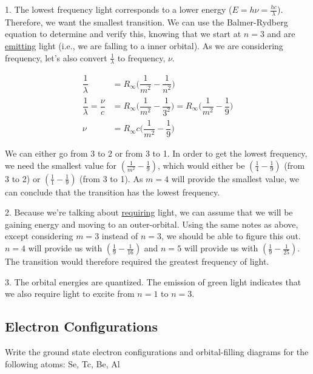\documentclass[12pt,letterpaper]{article}
\begin{document}
{\color{blue}

1. The lowest frequency light corresponds to a lower energy
($E=h\nu=\frac{hc}{\lambda}$). Therefore, we want the smallest transition. We
can use the Balmer-Rydberg equation to determine and verify this, knowing that
we start at $n=3$ and are \underline{emitting} light (i.e., we are falling to
a inner orbital). As we are considering frequency, let's also convert
$\frac{1}{\lambda}$ to frequency, $\nu$.

\begin{align*}
	\dfrac{1}{\lambda} &= R_\infty \bigg( \dfrac{1}{m^2} - \dfrac{1}{n^2}
	\bigg) \\
	\dfrac{1}{\lambda} = \dfrac{\nu}{c}
	&= R_\infty \bigg( \dfrac{1}{m^2} - \dfrac{1}{3^2} \bigg) 
	= R_\infty \bigg( \dfrac{1}{m^2} - \dfrac{1}{9} \bigg) \\
	\nu &= R_\infty c \bigg( \dfrac{1}{m^2} - \dfrac{1}{9} \bigg) 
\end{align*}

We can either go from 3 to 2 or from 3 to 1. In order to get the lowest
frequency, we need the smallest value for $(\frac{1}{m^2}-\frac{1}{9})$, which
would either be $(\frac{1}{4}-\frac{1}{9})$ (from 3 to 2) or
$(\frac{1}{1}-\frac{1}{9})$ (from 3 to 1). As $m=4$ will provide the smallest
value, we can conclude that the transition  has the lowest frequency.

2. Because we're talking about \underline{requiring} light, we can assume that
we will be gaining energy and moving to an outer-orbital. Using the same notes
as above, except considering $m=3$ instead of $n=3$, we should be able to figure
this out. $n=4$ will provide us with $(\frac{1}{9}-\frac{1}{16})$ and $n=5$ will
provide us with $(\frac{1}{9}-\frac{1}{25})$. The transition
 would therefore required the greatest
frequency of light.

3. The orbital energies are quantized. The emission of green light indicates
that we also require  light to excite from $n=1$ to
$n=3$.

}

\subsection*{Electron Configurations}

Write the ground state electron configurations and orbital-filling diagrams for
the following atoms: Se, Tc, Be, Al
\end{document}
